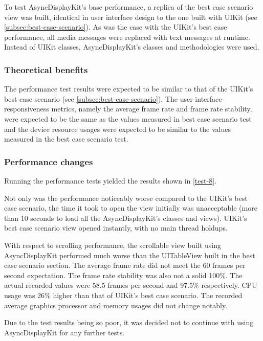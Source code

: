 \documentclass[a4paper,12pt]{article}
\begin{document}
To test AsyncDisplayKit's base performance, a replica of the best case scenario view was built, identical in user interface design to the one built with UIKit (see \autoref{subsec:best-case-scenario}). As was the case with the UIKit's best case performance, all media messages were replaced with text messages at runtime. Instead of UIKit classes, AsyncDisplayKit's classes and methodologies were used.

\subsubsection{Theoretical benefits}
The performance test results were expected to be similar to that of the UIKit's best case scenario (see \autoref{subsec:best-case-scenario}). The user interface responsiveness metrics, namely the average frame rate and frame rate stability, were expected to be the same as the values measured in best case scenario test and the device resource usages were expected to be similar to the values measured in the best case scenario test.

\subsubsection{Performance changes}
Running the performance tests yielded the results shown in \autoref{test-8}.

Not only was the performance noticeably worse compared to the UIKit's best case scenario, the time it took to open the view initially was unacceptable (more than 10 seconds to load all the AsyncDisplayKit's classes and views). UIKit's best case scenario view opened instantly, with no main thread holdups.

With respect to scrolling performance, the scrollable view built using AsyncDisplayKit performed much worse than the UITableView built in the best case scenario section. The average frame rate did not meet the 60 frames per second expectation. The frame rate stability was also not a solid 100\%. The actual recorded values were 58.5 frames per second and 97.5\% respectively. CPU usage was 26\% higher than that of UIKit's best case scenario. The recorded average graphics processor and memory usages did not change notably.

Due to the test results being so poor, it was decided not to continue with using AsyncDisplayKit for any further tests.
\end{document}
